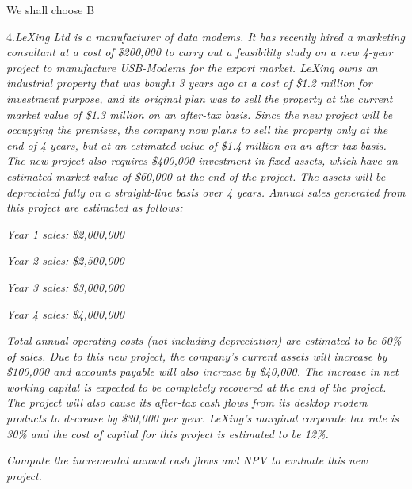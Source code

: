 \documentclass[10pt, a4paper]{article}
\begin{document}
\medskip
    We shall choose B 

\newpage

4.\emph{LeXing Ltd is a manufacturer of data modems. It has recently hired a marketing consultant at a cost of \$200,000 to carry out a feasibility study on a new 4-year project to manufacture USB-Modems for the export market. LeXing owns an industrial property that was bought 3 years ago at a cost of \$1.2 million for investment purpose, and its original plan was to sell the property at the current market value of \$1.3 million on an after-tax basis. Since the new project will be occupying the premises, the company now plans to sell the property only at the end of 4 years, but at an estimated value of \$1.4 million on an after-tax basis. The new project also requires \$400,000 investment in fixed assets, which have an estimated market value of \$60,000 at the end of the project. The assets will be depreciated fully on a straight-line basis over 4 years. Annual sales generated from this project are estimated as follows:}

\emph{Year 1 sales: \$2,000,000}

\emph{Year 2 sales: \$2,500,000}

\emph{Year 3 sales: \$3,000,000}

\emph{Year 4 sales: \$4,000,000}

\emph{Total annual operating costs (not including depreciation) are estimated to be 60\% of sales. Due to this new project, the company’s current assets will increase by \$100,000 and accounts payable will also increase by \$40,000. The increase in net working capital is expected to be completely recovered at the end of the project. The project will also cause its after-tax cash flows from its desktop modem products to decrease by \$30,000 per year. LeXing’s marginal corporate tax rate is 30\% and the cost of capital for this project is estimated to be 12\%.}

\emph{Compute the incremental annual cash flows and NPV to evaluate this new project.
}
\end{document}
